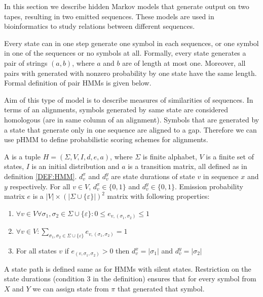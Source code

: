 In this section we  describe hidden Markov models that generate output on
two tapes, resulting in two emitted sequences. These models are used in
bioinformatics to study relations between different sequences.

Every state can in one step generate one symbol in each sequences, or one symbol
in one of the sequences or no symbols at all.
Formally, every state generates a pair of strings $(a,b)$, where $a$
and $b$ are of length at most one.
Moreover, all pairs with generated with nonzero probability by one state have
the same length.  Formal definition of pair HMMs is given below.

Aim of this type of model is to describe measures of similarities of sequences.
In terms of an alignments, symbols generated by same state are considered
homologous (are in same column of an alignment). Symbols that are generated by a
state that generate  only in one sequence are aligned to a gap. Therefore we can
use pHMM to define probabilistic scoring schemes for alignments.


\begin{definition}
A  is a tuple $H=(\Sigma,V,I,d,e,a)$, where $\Sigma$ is finite
alphabet, $V$ is a finite set of states, $I$ is an initial distribution and $a$ is
a transition matrix, all defined as
in definition \ref{DEF:HMM}. $d^x_v$ and $d^y_v$ are state durations of state $v$
in sequence $x$ and $y$ respectively. For all $v\in V$,
$d^x_v\in \{0,1\}$ and $d^y_v\in \{0,1\}$.
Emission probability matrix $e$ is
a $|V|\times\left(|\Sigma\cup\{\varepsilon\}|\right)^2$ matrix with following
properties:
\def\lala#1{\{#1\}}
\begin{enumerate}
\item
$\forall v\in V\forall \sigma_1,\sigma_2\in\Sigma\cup\{\varepsilon\}:
0\leq e_{v,(\sigma_1,\sigma_2)}\leq 1$

\item 
$\forall v\in V:
\sum_{\sigma_1,\sigma_2\in\Sigma\cup \lala{\varepsilon }}e_{v,(\sigma_1,\sigma_2)} = 1$

\item For all states $v$ if $e_{(v,\sigma_1,\sigma_2)}>0$ then
$d^x_v=|\sigma_1|$ and $d^y_v=|\sigma_2|$
\end{enumerate}

\end{definition}

A state path is defined same as for HMMs with silent states. Restriction on the
state durations (condition $3$ in the definition) ensures
that for every symbol from $X$ and $Y$ we can assign state from $\pi$ that
generated that symbol.

